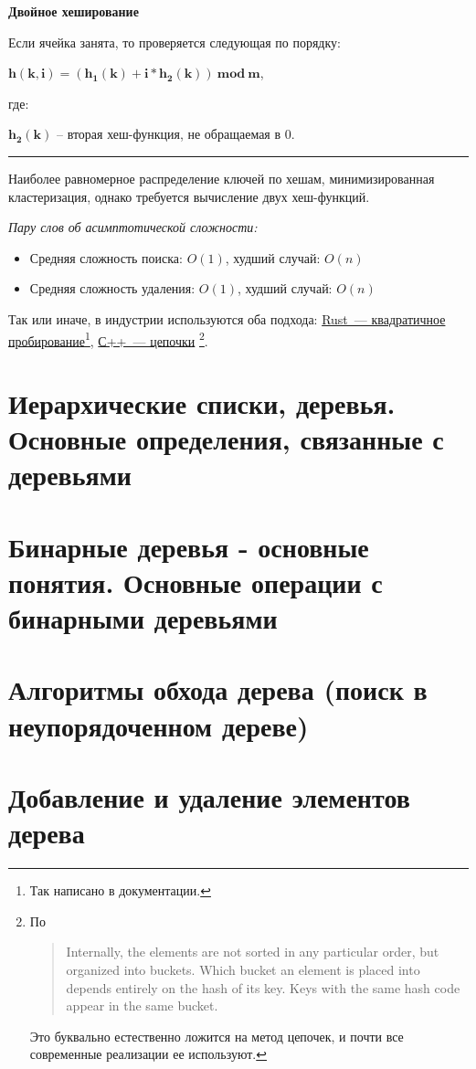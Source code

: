 \hfill
\begin{minipage}[t]{0.30\textwidth}
	\fontsize{8.5pt}{11pt}\selectfont
	\centerline{\small \textbf{Двойное хеширование}}\par

	Если ячейка занята, то проверяется следующая по порядку:\par
	\vspace{2pt}
	$\boldsymbol{h(k, i) = (h_{1}(k) +  i*h_{2}(k)) \ mod \ m}$,\par
	\vspace{2pt}
	где:\par
	$\boldsymbol{h_{2}(k)}$ -- вторая хеш-функция, не обращаемая в $0$.

	\vspace{17pt}
	\hrule
	\vspace{6pt}

	Наиболее равномерное распределение ключей по хешам, минимизированная кластеризация, однако требуется вычисление двух хеш-функций.
\end{minipage}
\vspace{10pt}

\textit{Пару слов об асимптотической сложности:}

\begin{itemize}
	\item {\footnotesize Средняя сложность поиска: $O(1)$, худший случай: $O(n)$}
	\item {\footnotesize Средняя сложность удаления: $O(1)$, худший случай: $O(n)$}
\end{itemize}

Так или иначе, в индустрии используются оба подхода:
\href{https://doc.rust-lang.org/std/collections/struct.HashMap.html}{Rust~--- квадратичное пробирование}\footnote{Так написано в документации.},
\href{https://en.cppreference.com/w/cpp/container/unordered_map.html}{С++~--- цепочки} \footnote{По  
  \begin{quote}
    Internally, the elements are not sorted in any particular order, but organized into buckets. Which bucket an element is placed into depends entirely on the hash of its key. Keys with the same hash code appear in the same bucket.
  \end{quote}
Это буквально естественно ложится на метод цепочек, и почти все современные реализации ее используют.}.

\section{Иерархические списки, деревья. Основные определения, связанные с деревьями}
\section{Бинарные деревья - основные понятия. Основные операции с бинарными деревьями}
\section{Алгоритмы обхода дерева (поиск в неупорядоченном дереве)}
\section{Добавление и удаление элементов дерева}
